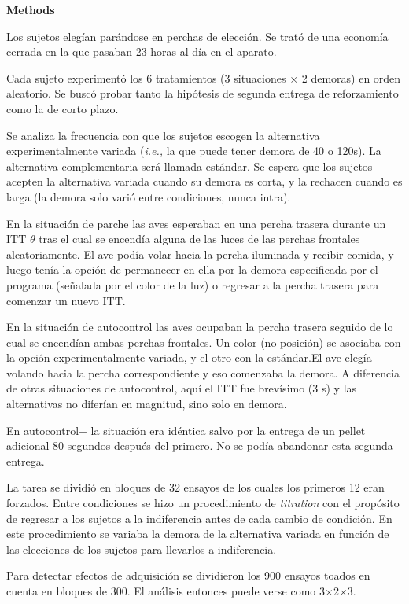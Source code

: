 \documentclass[a4paper,12pt]{article}
\begin{document}
{\bfseries Methods}

Los sujetos elegían parándose en perchas de elección. Se trató de una economía cerrada en la que pasaban 23 horas al día en el aparato.

Cada sujeto experimentó los 6 tratamientos (3 situaciones $\times$ 2 demoras) en orden aleatorio. Se buscó probar tanto la hipótesis de segunda entrega de reforzamiento como la de corto plazo.

Se analiza la frecuencia con que los sujetos escogen la alternativa experimentalmente variada ({\itshape i.e.,} la que puede tener demora de 40 o 120s). La alternativa complementaria será llamada estándar. Se espera que los sujetos acepten la alternativa variada cuando su demora es corta, y la rechacen cuando es larga (la demora solo varió entre condiciones, nunca intra).

En la situación de parche las aves esperaban en una percha trasera durante un ITT $\theta$ tras el cual se encendía alguna de las luces de las perchas frontales aleatoriamente. El ave podía volar hacia la percha iluminada y recibir comida, y luego tenía la opción de permanecer en ella por la demora especificada por el programa (señalada por el color de la luz) o regresar a la percha trasera para comenzar un nuevo ITT.

En la situación de autocontrol las aves ocupaban la percha trasera seguido de lo cual se encendían ambas perchas frontales. Un color (no posición) se asociaba con la opción experimentalmente variada, y el otro con la estándar.El ave elegía volando hacia la percha correspondiente y eso comenzaba la demora. A diferencia de otras situaciones de autocontrol, aquí el ITT fue brevísimo (3 s) y las alternativas no diferían en magnitud, sino solo en demora.

En autocontrol+ la situación era idéntica salvo por la entrega de un pellet adicional 80 segundos después del primero. No se podía abandonar esta segunda entrega.

La tarea se dividió en bloques de 32 ensayos de los cuales los primeros 12 eran forzados. Entre condiciones se hizo un procedimiento de {\itshape titration} con el propósito de regresar a los sujetos a la indiferencia antes de cada cambio de condición. En este procedimiento se variaba la demora de la alternativa variada en función de las elecciones de los sujetos para llevarlos a indiferencia.

Para detectar efectos de adquisición se dividieron los 900 ensayos toados en cuenta en bloques de 300. El análisis entonces puede verse como 3$\times$2$\times$3.
\end{document}
